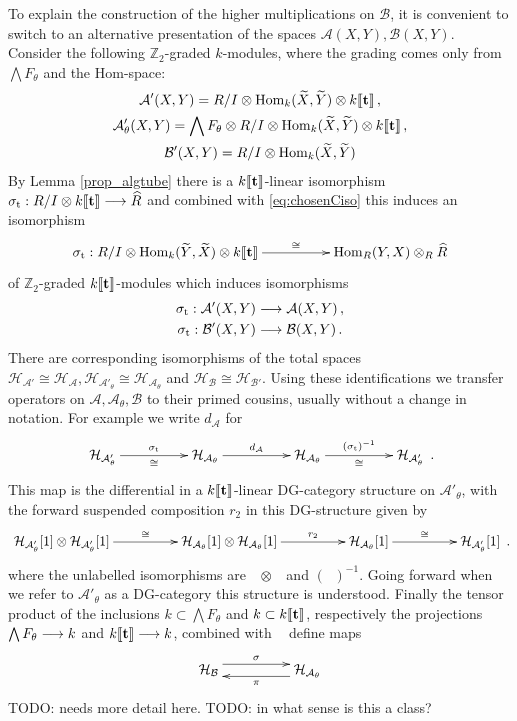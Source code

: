 \documentclass[english,letter paper,12pt,leqno]{article}
\theoremstyle{example}
\numberwithin{equation}{section}
\def\AA{\mathcal{A}}
\def\BB{\mathcal{B}}
\def\HH{\HH}
\def\HH{\mathcal{H}}
\def\Hom{\operatorname{Hom}}
\def\be{\begin{equation}}
\def\ee{\end{equation}}
\def\nZ{\mathds{Z}}
\DeclareMathOperator{\sigmastar}{\sigma_t}
\begin{document}
To explain the construction of the higher multiplications on $\BB$, it is convenient to switch to an alternative presentation of the spaces $\AA(X,Y), \BB(X,Y)$. Consider the following $\nZ_2$-graded $k$-modules, where the grading comes only from $\bigwedge F_\theta$ and the Hom-space:
\begin{gather}
\AA'(X,Y) = R/I \otimes \Hom_k(\widetilde{X},\widetilde{Y}) \otimes k\llbracket \bold{t} \rrbracket\,, \label{eq:HHoriginal}\\
\AA'_\theta(X,Y) = \bigwedge F_\theta \otimes R/I \otimes \Hom_k(\widetilde{X},\widetilde{Y}) \otimes k\llbracket \bold{t} \rrbracket\,, \label{eq:HHoriginal}\\
\BB'(X,Y) = R/I \otimes \Hom_k(\widetilde{X},\widetilde{Y}) \label{eq:KKoriginal}
\end{gather}
By Lemma \ref{prop_algtube} there is a $k\llbracket \bold{t} \rrbracket$-linear isomorphism $\sigmastar: R/I \otimes k \llbracket \bold{t} \rrbracket \lto \widehat{R}$ and combined with \eqref{eq:chosenCiso} this induces an isomorphism
\be\label{eq:transfer_iso_intro}
\xymatrix@C+2pc{
\sigmastar: R/I \otimes \Hom_k(\coeff{Y},\coeff{X}) \otimes k\llbracket \bold{t} \rrbracket \ar[r]^-{\cong} & 
\Hom_R(Y,X) \otimes_R \widehat{R}
}
\ee
of $\nZ_2$-graded $k\llbracket \bold{t} \rrbracket$-modules which induces isomorphisms
\begin{gather*}
\sigmastar: \AA'(X,Y) \lto \AA(X,Y)\,,\\
\sigmastar: \BB'(X,Y) \lto \BB(X,Y)\,.
\end{gather*}
There are corresponding isomorphisms of the total spaces $\HH_{\AA'} \cong \HH_{\AA}, \HH_{\AA'_\theta} \cong \HH_{\AA_\theta}$ and $\HH_{\BB} \cong \HH_{\BB'}$. Using these identifications we transfer operators on $\AA,\AA_\theta,\BB$ to their primed cousins, usually without a change in notation. For example we write $d_\AA$ for
\[
\xymatrix@C+2pc{
\HH_{\AA'_\theta} \ar[r]^-{\sigmastar}_-{\cong} & \HH_{\AA_\theta} \ar[r]^-{d_{\AA}} & \HH_{\AA_\theta} \ar[r]^-{(\sigmastar)^{-1}}_-{\cong} & \HH_{\AA'_\theta}
}\,.
\]
This map is the differential in a $k\llbracket \bold{t} \rrbracket$-linear DG-category structure on $\AA'_\theta$, with the forward suspended composition $r_2$ in this DG-structure given by
\[
\xymatrix@C+2pc{
\HH_{\AA'_\theta}[1] \otimes \HH_{\AA'_\theta}[1] \ar[r]^-{\cong} & \HH_{\AA_\theta}[1] \otimes \HH_{\AA_\theta}[1] \ar[r]^-{r_2} & \HH_{\AA_\theta}[1] \ar[r]^-{\cong} & \HH_{\AA'_{\theta}}[1]
}\,.
\]
where the unlabelled isomorphisms are $\sigmastar \otimes \sigmastar$ and $(\sigmastar)^{-1}$. Going forward when we refer to $\AA'_\theta$ as a DG-category this structure is understood. Finally the tensor product of the inclusions $k \subset \bigwedge F_\theta$ and $k \subset k\llbracket \bold{t} \rrbracket$, respectively the projections $\bigwedge F_\theta \longrightarrow k$ and $k \llbracket \bold{t} \rrbracket \longrightarrow k$, combined with $\sigmastar$ define maps
\[
\xymatrix@C+2pc{
\HH_{\BB} \ar@<1ex>[r]^-{\sigma} & \HH_{\AA_\theta}\ar@<1ex>[l]^-{\pi}
}
\]
TODO: needs more detail here. TODO: in what sense is this a class?
\end{document}
